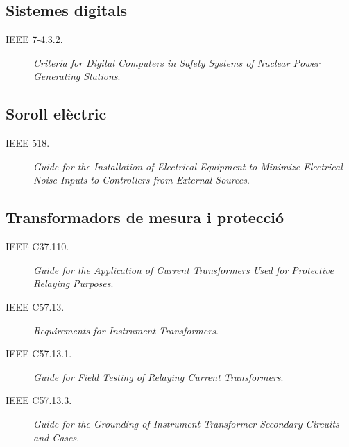\subsection*{Sistemes digitals}
\begin{description}
    \item [\hspace{5mm}IEEE 7-4.3.2.] \textit{Criteria for Digital Computers in Safety Systems of Nuclear Power Generating Stations}.
\end{description}


\subsection*{Soroll elèctric}
\begin{description}
    \item [\hspace{5mm}IEEE 518.] \textit{Guide for the Installation of Electrical Equipment to Minimize Electrical Noise Inputs to Controllers from External Sources}.
\end{description}


\subsection*{Transformadors de mesura i protecció}
\begin{description}
    \item [\hspace{5mm}IEEE C37.110.] \textit{Guide for the Application of Current Transformers Used for Protective Relaying Purposes}.
    \item [\hspace{5mm}IEEE C57.13.] \textit{Requirements for Instrument Transformers}.
    \item [\hspace{5mm}IEEE C57.13.1.] \textit{Guide for Field Testing of Relaying Current Transformers}.
    \item [\hspace{5mm}IEEE C57.13.3.]  \textit{Guide for the Grounding of Instrument Transformer Secondary Circuits and Cases}.
\end{description}


